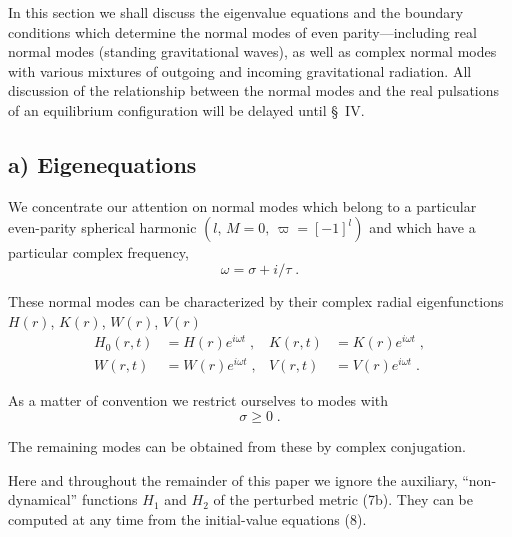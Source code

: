 \documentclass[12pt]{article}
\begin{document}
In this section we shall discuss the eigenvalue equations and the boundary conditions
which determine the normal modes of even parity---including real normal modes (standing
gravitational waves), as well as complex normal modes with various mixtures of
outgoing and incoming gravitational radiation. All discussion of the relationship between the normal modes and the real pulsations of an equilibrium configuration will
be delayed until \S~IV.

\subsection*{a) Eigenequations}

We concentrate our attention on normal modes which belong to a particular even-parity
spherical harmonic $(l,\, M = 0,\, \varpi = [-1]^{l})$ and which have a particular complex
frequency,
\begin{equation}
  \omega = \sigma + i/\tau \;.
\label{eq:11}
\end{equation}

These normal modes can be characterized by their complex radial eigenfunctions $H(r)$,
$K(r)$, $W(r)$, $V(r)$
\begin{equation}
  \begin{aligned}
    H_{0}(r,t) &= H(r)e^{i\omega t} \;, & K(r,t) &= K(r)e^{i\omega t} \;, \\
    W(r,t)     &= W(r)e^{i\omega t} \;, & V(r,t) &= V(r)e^{i\omega t} \;.
  \end{aligned}
\label{eq:12}
\end{equation}

As a matter of convention we restrict ourselves to modes with
\begin{equation}
  \sigma \geq 0 \;.
\label{eq:13}
\end{equation}

The remaining modes can be obtained from these by complex conjugation.

Here and throughout the remainder of this paper we ignore the auxiliary,
``non-dynamical'' functions $H_{1}$ and $H_{2}$ of the perturbed metric (7b). They can be
computed at any time from the initial-value equations (8).
\end{document}
